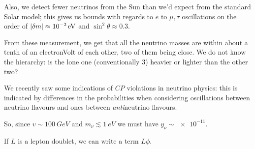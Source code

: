 \documentclass[main.tex]{subfiles}
\begin{document}
Also, we detect fewer neutrinos from the Sun than we'd expect from the standard Solar model; this gives us bounds with regards to \(e\) to \(\mu , \tau \) oscillations on the order of \(\abs{\delta m} \approx \SI{e-2}{eV}\) and \(\sin^2\theta \approx 0.3\).

From these measurement, we get that all the neutrino masses are within about a tenth of an electronVolt of each other, two of them being close.
We do not know the hierarchy: is the lone one (conventionally \(3\)) heavier or lighter than the other two?

We recently saw some indications of \(CP\) violations in neutrino physics: this is indicated by differences in the probabilities when considering oscillations between neutrino flavours and ones between \emph{anti}neutrino flavours.









So, since \(v \sim \SI{100}{GeV}\) and \(m_{\nu } \lesssim \SI{1}{eV}\) we must have \(y_{\nu } \sim \num{e-11}\).


If \(L\) is a lepton doublet, we can write a term \(L \phi \).
\end{document}
